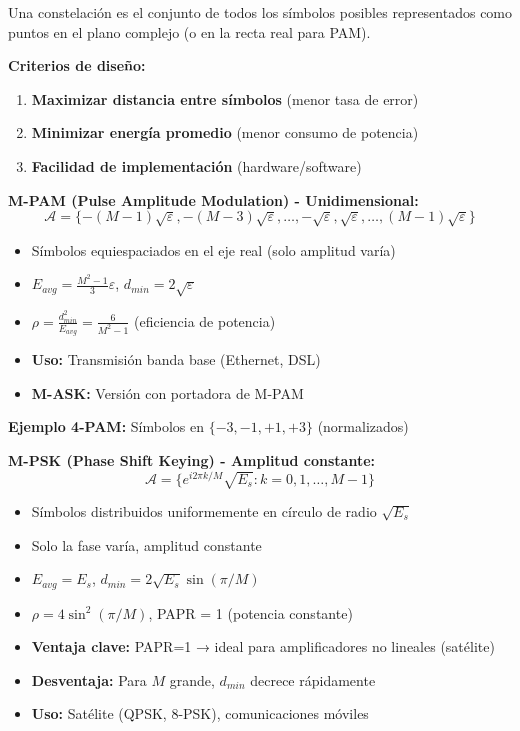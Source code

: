 \documentclass[10pt,a4paper]{article}
\begin{document}
Una constelación es el conjunto de todos los símbolos posibles representados como puntos en el plano complejo (o en la recta real para PAM).

\textbf{Criterios de diseño:}
\begin{enumerate}
\item \textbf{Maximizar distancia entre símbolos} (menor tasa de error)
\item \textbf{Minimizar energía promedio} (menor consumo de potencia)
\item \textbf{Facilidad de implementación} (hardware/software)
\end{enumerate}

\textbf{M-PAM (Pulse Amplitude Modulation) - Unidimensional:}
$$\mathcal{A} = \{-(M-1)\sqrt{\varepsilon}, -(M-3)\sqrt{\varepsilon}, \ldots, -\sqrt{\varepsilon}, \sqrt{\varepsilon}, \ldots, (M-1)\sqrt{\varepsilon}\}$$

\begin{itemize}
\item Símbolos equiespaciados en el eje real (solo amplitud varía)
\item $E_{avg} = \frac{M^2-1}{3}\varepsilon$, \quad $d_{min} = 2\sqrt{\varepsilon}$
\item $\rho = \frac{d_{min}^2}{E_{avg}} = \frac{6}{M^2-1}$ (eficiencia de potencia)
\item \textbf{Uso:} Transmisión banda base (Ethernet, DSL)
\item \textbf{M-ASK:} Versión con portadora de M-PAM
\end{itemize}

\textbf{Ejemplo 4-PAM:} Símbolos en $\{-3, -1, +1, +3\}$ (normalizados)

\textbf{M-PSK (Phase Shift Keying) - Amplitud constante:}
$$\mathcal{A} = \{e^{i2\pi k/M}\sqrt{E_s} : k = 0,1,\ldots,M-1\}$$

\begin{itemize}
\item Símbolos distribuidos uniformemente en círculo de radio $\sqrt{E_s}$
\item Solo la fase varía, amplitud constante
\item $E_{avg} = E_s$, \quad $d_{min} = 2\sqrt{E_s}\sin(\pi/M)$
\item $\rho = 4\sin^2(\pi/M)$, \quad PAPR = 1 (potencia constante)
\item \textbf{Ventaja clave:} PAPR=1 → ideal para amplificadores no lineales (satélite)
\item \textbf{Desventaja:} Para $M$ grande, $d_{min}$ decrece rápidamente
\item \textbf{Uso:} Satélite (QPSK, 8-PSK), comunicaciones móviles
\end{itemize}
\end{document}
